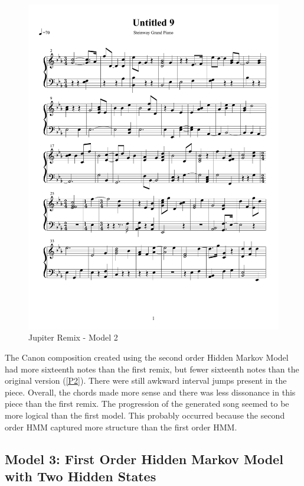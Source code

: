 \documentclass{article} %
\begin{document}
\begin{figure}[H]
\centering

\includegraphics [scale = 0.6] {JupiterRemix2-cropped.pdf}
\caption{Jupiter Remix - Model 2\label{J2}}
\end{figure}

The Canon composition created using the second order Hidden Markov Model had more sixteenth notes than the first remix, but fewer sixteenth notes than the original version ({\autoref{P2}}). There were still awkward interval jumps present in the piece. Overall, the chords made more sense and there was less dissonance in this piece than the first remix. The progression of the generated song seemed to be more logical than the first model. This probably occurred because the second order HMM captured more structure than the first order HMM.

\subsection{Model 3: First Order Hidden Markov Model with Two Hidden States}
\end{document}
